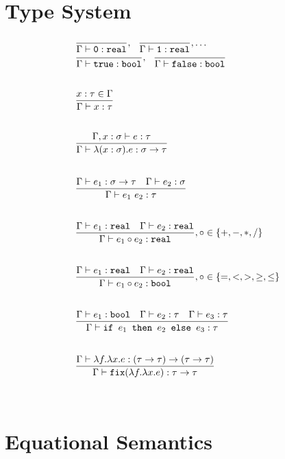 \section{Type System}
\[
\begin{array}{lr}
\dfrac{}{\Gamma \vdash \texttt{0}: \texttt{real}}, \ \ \dfrac{}{\Gamma \vdash \texttt{1}: \texttt{real}}, \ldots \\
\dfrac{}{\Gamma \vdash \texttt{true} : \texttt{bool}}, \ \ \dfrac{}{\Gamma \vdash \texttt{false} : \texttt{bool}} \\ \\ \\
\dfrac{x : \tau \in \Gamma}{\Gamma \vdash x : \tau } \\ \\ \\
\dfrac{\Gamma, x : \sigma \vdash e : \tau}{\Gamma \vdash \lambda (x : \sigma).e : \sigma \rightarrow \tau } \\ \\ \\ 
\dfrac{\Gamma \vdash e_1: \sigma \rightarrow \tau \ \ \ \Gamma \vdash e_2 : \sigma}{\Gamma \vdash e_1 \ e_2 : \tau} \\ \\ \\
\dfrac{\Gamma \vdash e_1 : \texttt{real} \ \ \ \Gamma \vdash e_2 : \texttt{real}}{\Gamma \vdash e_1 \circ e_2 : \texttt{real}}
, \circ \in \{+,-,*,/\} \\ \\ \\
\dfrac{\Gamma \vdash e_1 : \texttt{real} \ \ \ \Gamma \vdash e_2 : \texttt{real}}{\Gamma \vdash e_1 \circ e_2 : \texttt{bool}}
, \circ \in \{=, <, >, \geq, \leq\} \\ \\ \\
\dfrac{\Gamma \vdash e_1 : \texttt{bool} \ \ \ \Gamma \vdash e_2 : \tau \ \ \ \Gamma \vdash e_3 : \tau}
{\Gamma \vdash \ifelse{e_1}{e_2}{e_3} : \tau} \\ \\ \\
\dfrac{\Gamma \vdash \lambda f. \lambda x.e : (\tau \rightarrow \tau) \rightarrow (\tau \rightarrow \tau)}
{\Gamma \vdash \texttt{fix}(\lambda f. \lambda x.e) : \tau \rightarrow \tau} \\ \\ \\ 
\end{array}
\]

\section{Equational Semantics}

